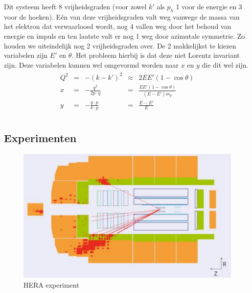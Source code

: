 \documentclass[../main.tex]{subfiles}
\begin{document}
Dit systeem heeft 8 vrijheidsgraden (voor zowel $k'$ als $p_h$ 1 voor de energie en 3 voor de hoeken). Eén van deze vrijheidsgraden valt weg vanwege de massa van het elektron dat verwaarloosd wordt, nog 4 vallen weg door het behoud van energie en impuls en ten laatste valt er nog 1 weg door azimutale symmetrie. Zo houden we uiteindelijk nog 2 vrijheidsgraden over. De 2 makkelijkst te kiezen variabelen zijn $E'$ en $\theta$. Het probleem hierbij is dat deze niet Lorentz invariant zijn. Deze variabelen kunnen wel omgevormd worden naar $x$ en $y$ die dit wel zijn.
\begin{equation}
    \begin{aligned}
        \label{eq:etheta_naanr_xy}
        \begin{matrix}
            Q^2 & = & -(k-k')^2                 & \approx   & 2EE'(1-\cos\theta) \\
            x   & = & -\frac{q^2}{2p\cdot q}    & =         & \frac{EE'(1-\cos\theta)}{(E-E')m_p} \\
            y   & = & -\frac{q\cdot p}{k\cdot p}& =         & \frac{E-E'}{E} \\
        \end{matrix}
    \end{aligned}
\end{equation}

\subsection{Experimenten}%
\label{sub:experimenten}

\begin{figure}[h]
    \centering
    \includegraphics[width=0.6\linewidth]{DIS_nucleon_structuur_pdf/hera.png}
    \caption{HERA experiment}%
    \label{fig:hera}
\end{figure}
\end{document}
